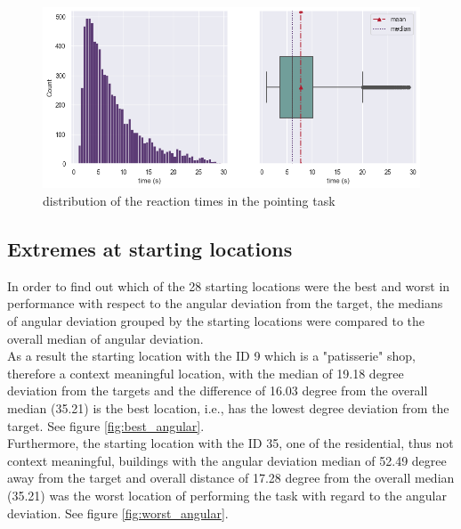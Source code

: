\begin{enumerate}
	\begin{figure}[h]
		\centering
		\includegraphics[width=150mm]{figures/RT_hist_box_23.png}
		\caption[Distribution of reaction times]{distribution of the  reaction times in the pointing task}
		\label{fig:rt_dists}
	\end{figure}
	
\end{enumerate}

\subsection{Extremes at starting locations}
In order to find out which of the 28 starting locations were the best and worst in performance with respect to the angular deviation from the target, the medians of angular deviation grouped by the starting locations were compared to the overall median of angular deviation.\\
As a result the starting location with the ID 9 which is a "patisserie" shop, therefore a context meaningful location, with the median of 19.18 degree deviation from the targets and the difference of 16.03 degree from the overall median (35.21) is the best location, i.e., has the lowest degree deviation from the target. See figure \ref{fig:best_angular}.\\
Furthermore, the starting location with the ID 35, one of the residential, thus not context meaningful, buildings with the angular deviation median of 52.49 degree away from the target and overall distance of 17.28 degree from the overall median (35.21) was the worst location of performing the task with regard to the angular deviation. See figure \ref{fig:worst_angular}.

